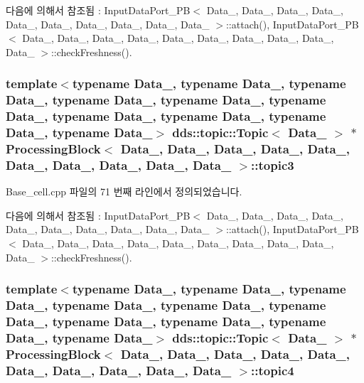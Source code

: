 다음에 의해서 참조됨 \+:  Input\+Data\+Port\+\_\+\+P\+B$<$ Data\+\_, Data\+\_, Data\+\_, Data\+\_, Data\+\_, Data\+\_, Data\+\_, Data\+\_, Data\+\_, Data\+\_ $>$\+::attach(), Input\+Data\+Port\+\_\+\+P\+B$<$ Data\+\_, Data\+\_, Data\+\_, Data\+\_, Data\+\_, Data\+\_, Data\+\_, Data\+\_, Data\+\_, Data\+\_ $>$\+::check\+Freshness().

\subsubsection[{\texorpdfstring{topic3}{topic3}}]{\setlength{\rightskip}{0pt plus 5cm}template$<$typename Data\+\_, typename Data\+\_, typename Data\+\_, typename Data\+\_, typename Data\+\_, typename Data\+\_, typename Data\+\_, typename Data\+\_, typename Data\+\_, typename Data\+\_$>$ dds\+::topic\+::\+Topic$<$ Data\+\_ $>$ $\ast$ {\bf Processing\+Block}$<$ Data\+\_, Data\+\_, Data\+\_, Data\+\_, Data\+\_, Data\+\_, Data\+\_, Data\+\_, Data\+\_, Data\+\_ $>$\+::topic3}\hypertarget{classProcessingBlock_a3549c6ba84ea050b6da2c5512543ee27}{}\label{classProcessingBlock_a3549c6ba84ea050b6da2c5512543ee27}


Base\+\_\+cell.\+cpp 파일의 71 번째 라인에서 정의되었습니다.



다음에 의해서 참조됨 \+:  Input\+Data\+Port\+\_\+\+P\+B$<$ Data\+\_, Data\+\_, Data\+\_, Data\+\_, Data\+\_, Data\+\_, Data\+\_, Data\+\_, Data\+\_, Data\+\_ $>$\+::attach(), Input\+Data\+Port\+\_\+\+P\+B$<$ Data\+\_, Data\+\_, Data\+\_, Data\+\_, Data\+\_, Data\+\_, Data\+\_, Data\+\_, Data\+\_, Data\+\_ $>$\+::check\+Freshness().

\subsubsection[{\texorpdfstring{topic4}{topic4}}]{\setlength{\rightskip}{0pt plus 5cm}template$<$typename Data\+\_, typename Data\+\_, typename Data\+\_, typename Data\+\_, typename Data\+\_, typename Data\+\_, typename Data\+\_, typename Data\+\_, typename Data\+\_, typename Data\+\_$>$ dds\+::topic\+::\+Topic$<$ Data\+\_ $>$ $\ast$ {\bf Processing\+Block}$<$ Data\+\_, Data\+\_, Data\+\_, Data\+\_, Data\+\_, Data\+\_, Data\+\_, Data\+\_, Data\+\_, Data\+\_ $>$\+::topic4}\hypertarget{classProcessingBlock_ad87250e1db0e762ef533c5c42a0d664f}{}\label{classProcessingBlock_ad87250e1db0e762ef533c5c42a0d664f}



